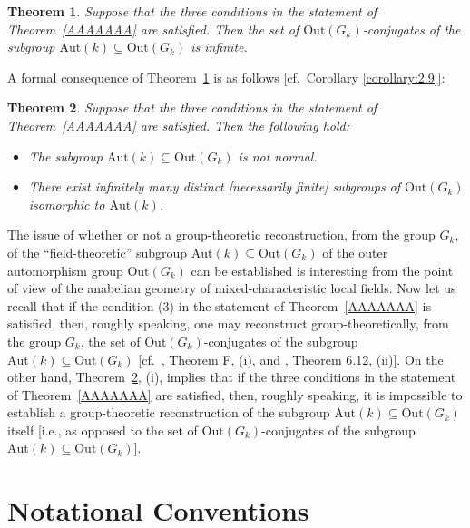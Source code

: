 \documentclass[11pt,showkeys]{article}
\theoremstyle{theorem}
\newtheorem{introtheorem}{Theorem}
\theoremstyle{definition}
\begin{document}
\begin{introtheorem}
\label{BBBBBBB}
Suppose that the three conditions in the statement of 
Theorem~\ref{AAAAAAA} are satisfied.  Then the set of 
$\mathrm{Out}(G_k)$-conjugates of the subgroup 
$\mathrm{Aut}(k) \subseteq \mathrm{Out}(G_k)$ is 
infinite.  
\end{introtheorem}


A formal consequence of Theorem~\ref{BBBBBBB} is as 
follows [cf.\ Corollary \ref{corollary:2.9}]:  


\begin{introtheorem}
\label{CCCCCCC}
Suppose that the three conditions in the statement of 
Theorem~\ref{AAAAAAA} are satisfied.  
Then the following hold:  
\begin{itemize}
\item[$(\mathrm{i})$]
The subgroup $\mathrm{Aut}(k) \subseteq 
\mathrm{Out}(G_k)$ is not normal.  
\item[$(\mathrm{ii})$]
There exist infinitely many distinct [necessarily 
finite] subgroups of $\mathrm{Out}(G_k)$ isomorphic 
to $\mathrm{Aut}(k)$.  
\end{itemize}
\end{introtheorem}


The issue of whether or not a group-theoretic 
reconstruction, from the group $G_k$, of the 
``field-theoretic'' subgroup 
$\mathrm{Aut}(k) \subseteq \mathrm{Out}(G_k)$ 
of the outer automorphism group $\mathrm{Out}(G_k)$ 
can be established is interesting from the 
point of view of the anabelian geometry of 
mixed-characteristic local fields.  
Now let us recall that if the condition (3) in the 
statement of Theorem~\ref{AAAAAAA} 
is satisfied, then, roughly speaking, 
one may reconstruct group-theoretically, 
from the group $G_k$, the set of 
$\mathrm{Out}(G_k)$-conjugates of the 
subgroup $\mathrm{Aut}(k) \subseteq \mathrm{Out}(G_k)$ 
[cf.\ \cite{Hoshi2}, Theorem F, (i), and 
\cite{Hoshi2}, Theorem 6.12, (ii)].  
On the other hand, Theorem~\ref{CCCCCCC}, (i), 
implies that if the three conditions in the statement 
of Theorem~\ref{AAAAAAA} are satisfied, then, 
roughly speaking, it is impossible to establish 
a group-theoretic reconstruction of the 
subgroup $\mathrm{Aut}(k) \subseteq \mathrm{Out}(G_k)$ 
itself [i.e., as opposed to the set of $\mathrm{Out}(G_k)$-conjugates of the subgroup 
$\mathrm{Aut}(k) \subseteq \mathrm{Out}(G_k)$].  

\section{Notational Conventions}\label{section0}
\end{document}

